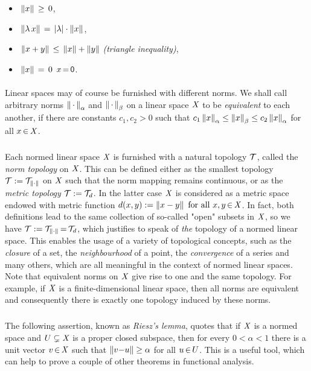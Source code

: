 \documentclass[11pt,twoside]{article}
\begin{document}
\begin{itemize}[leftmargin=40pt,topsep=2pt,itemsep=2pt]
\item[(N-1)]
\,$\left\lVert x \right\rVert \, \geq \, 0$,

\item[(N-2)]
\,$\norm{\lambda \, x} \= \abs{\lambda} \cdot \norm{x}$,

\item[(N-3)]
\,$\left\lVert x+y \right\rVert \, \leq \, \left\lVert x \right\rVert + \left\lVert y \right\rVert$
\; \textit{(triangle inequality)},

\item[(N-4)]
\,$\left\lVert x \right\rVert \,=\, 0$ \iff $x {\,=\,} {\mathsf{0}}$.
\end{itemize}

\paragraph{} %
Linear spaces may of course be furnished with different norms.
We shall call arbitrary norms
$\left\lVert \,\cdot\, \right\rVert_{\alpha}$ and $\left\lVert \,\cdot\, \right\rVert_{\beta}$
on a linear space $\mathit{X}$ to be \textit{equivalent} to each another,
if there are constants $c_1,c_2 > 0$ such that
$
c_1 \left\lVert x \right\rVert_{\alpha} \leq
    \left\lVert x \right\rVert_{\beta}  \leq 
c_2 \left\lVert x \right\rVert_{\alpha}$
for all $x {\,\in\,} \mathit{X}$.

\subparagraph{}
Each normed linear space $\mathit{X}$ is furnished with a natural topology $\mathcal{T}$,
called the \textit{norm topology} on $\mathit{X}$.
This can be defined either as the smallest topology
$\mathcal{T} := \mathcal{T}_{\left\lVert \cdot \right\rVert}$ on $\mathit{X}$
such that the norm mapping remains continuous,
or as the \textit{metric topology} $\mathcal{T} := \mathcal{T}_d$.
In the latter case $\mathit{X}$ is considered as a metric space
endowed with metric function $d(x,y) := \left\lVert x-y \right\rVert \mbox{ for all } x,y {\,\in\,} \mathit{X}$.
In fact,
both definitions lead to the same collection of so-called
"open" subsets in $\mathit{X}$,
so we have $\mathcal{T} := \mathcal{T}_{\left\lVert \cdot \right\rVert} {\,=\,} \mathcal{T}_d$,
which justifies to speak of \textit{the} topology of a normed linear space.
This enables the usage of a variety of topological concepts,
such as the \textit{closure} of a set,
the \textit{neighbourhood} of a point,
the \textit{convergence} of a series and many others,
which are all meaningful in the context of normed linear spaces.
Note
that equivalent norms on $\mathit{X}$ give rise to one and the same topology.
For example,
if $\mathit{X}$ is a finite-dimensional linear space,
then all norms are equivalent
and consequently there is exactly one topology induced by these norms.

\subparagraph{}
The following assertion,
known as \textit{Riesz's lemma},
quotes
that if $\mathit{X}$ is a normed space
and $U \subsetneq \mathit{X}$ is a proper closed subspace,
then for every $0 < \alpha < 1$ there is a unit vector $v {\,\in\,} \mathit{X}$
such that $\left\lVert v{-}u \right\rVert \geq \alpha$ for all $u {\,\in\,} U$.
This is a useful tool,
which can help to prove a couple of other theorems in functional analysis.
\end{document}

